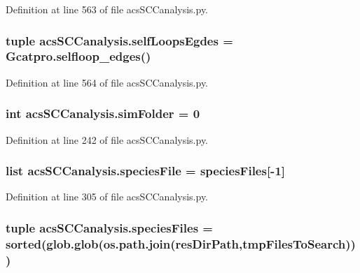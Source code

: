 Definition at line 563 of file acs\-S\-C\-Canalysis.\-py.

\hypertarget{a00096_ad34596e89eef2cfb696f61a810765c7a}{
\subsubsection[{self\-Loops\-Egdes}]{\setlength{\rightskip}{0pt plus 5cm}tuple acs\-S\-C\-Canalysis.\-self\-Loops\-Egdes = Gcatpro.\-selfloop\-\_\-edges()}}\label{a00096_ad34596e89eef2cfb696f61a810765c7a}


Definition at line 564 of file acs\-S\-C\-Canalysis.\-py.

\hypertarget{a00096_a58095f64afeda893517e81226e1963c3}{
\subsubsection[{sim\-Folder}]{\setlength{\rightskip}{0pt plus 5cm}int acs\-S\-C\-Canalysis.\-sim\-Folder = 0}}\label{a00096_a58095f64afeda893517e81226e1963c3}


Definition at line 242 of file acs\-S\-C\-Canalysis.\-py.

\hypertarget{a00096_a1d066fa24dced2da12ffd9a8514a17ba}{
\subsubsection[{species\-File}]{\setlength{\rightskip}{0pt plus 5cm}list acs\-S\-C\-Canalysis.\-species\-File = {\bf species\-Files}\mbox{[}-\/1\mbox{]}}}\label{a00096_a1d066fa24dced2da12ffd9a8514a17ba}


Definition at line 305 of file acs\-S\-C\-Canalysis.\-py.

\hypertarget{a00096_a4f47408478e9a0590d016df50cf42141}{
\subsubsection[{species\-Files}]{\setlength{\rightskip}{0pt plus 5cm}tuple acs\-S\-C\-Canalysis.\-species\-Files = sorted(glob.\-glob(os.\-path.\-join({\bf res\-Dir\-Path},{\bf tmp\-Files\-To\-Search})))}}\label{a00096_a4f47408478e9a0590d016df50cf42141}


